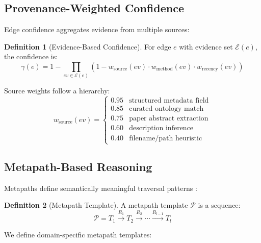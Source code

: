 \documentclass{article}
\theoremstyle{definition}
\newtheorem{definition}{Definition}[section]
\newcommand{\confidence}{\gamma}
\newcommand{\evidence}{\mathcal{E}}
\begin{document}
\subsection{Provenance-Weighted Confidence}

Edge confidence aggregates evidence from multiple sources:

\begin{definition}[Evidence-Based Confidence]
\label{def:confidence}
For edge $e$ with evidence set $\evidence(e)$, the confidence is:
\begin{equation}
\confidence(e) = 1 - \prod_{ev \in \evidence(e)} (1 - w_{\text{source}}(ev) \cdot w_{\text{method}}(ev) \cdot w_{\text{recency}}(ev))
\end{equation}
\end{definition}

Source weights follow a hierarchy:
\begin{equation}
w_{\text{source}}(ev) = \begin{cases}
    0.95 & \text{structured metadata field} \\
    0.85 & \text{curated ontology match} \\
    0.75 & \text{paper abstract extraction} \\
    0.60 & \text{description inference} \\
    0.40 & \text{filename/path heuristic}
\end{cases}
\end{equation}

\subsection{Metapath-Based Reasoning}

Metapaths define semantically meaningful traversal patterns \citep{sun2011pathsim}:

\begin{definition}[Metapath Template]
A metapath template $\mathcal{P}$ is a sequence:
\begin{equation}
\mathcal{P} = T_1 \xrightarrow{R_1} T_2 \xrightarrow{R_2} \cdots \xrightarrow{R_{l-1}} T_l
\end{equation}
\end{definition}

We define domain-specific metapath templates:
\end{document}
